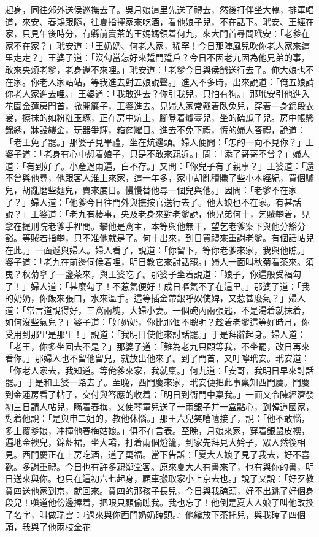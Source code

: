 \begin{showcontents}{}
起身，同往郊外送侯巡撫去了。吳月娘這里先送了禮去，然後打伴坐大轎，排軍唱道，來安、春鴻跟隨，往夏指揮家來吃酒，看他娘子兒，不在話下。玳安、王經在家，只見午後時分，有縣前賣茶的王媽媽領着何九，來大門首尋問玳安：「老爹在家不在家？」玳安道：「王奶奶、何老人家，稀罕！今日那陣風兒吹你老人家來這里走走？」王婆子道：「沒勾當怎好來踅門踅戶？今日不因老九因為他兄弟的事，敢來央煩老爹，老身還不來哩。」玳安道：「老爹今日與侯爺送行去了。俺大娘也不在家。你老人家站站，等我進去對五娘說聲。」進入不多時，出來說道：「俺五娘請你老人家進去哩。」王婆道：「我敢進去？你引我兒，只怕有狗。」那玳安引他進入花園金蓮房門首，掀開簾子，王婆進去。見婦人家常戴着臥兔兒，穿着一身錦段衣裳，擦抹的如粉粧玉琢，正在房中炕上，腳登着爐臺兒，坐的磕瓜子兒。房中帳懸錦綉，牀設縷金，玩器爭輝，箱奩耀目。進去不免下禮，慌的婦人答禮，說道：「老王免了罷。」那婆子見畢禮，坐在炕邊頭。婦人便問：「怎的一向不見你？」王婆子道：「老身有心中想着娘子，只是不敢來親近。」問：「添了哥哥不曾？」婦人道：「有到好了。小產過兩遍，白不存。」又問：「你兒子有了親事？」王婆道：「還不曾與他尋，他跟客人淮上來家，這一年多，家中胡亂積賺了些小本經紀，買個驢兒，胡亂磨些麵兒，賣來度日。慢慢替他尋一個兒與他。」因問：「老爹不在家了？」婦人道：「他爹今日往門外與撫按官送行去了。他大娘也不在家。有甚話說？」王婆道：「老九有樁事，央及老身來對老爹說，他兄弟何十，乞賊攀着，見拿在提刑院老爹手裡問。攀他是窩主，本等與他無干，望乞老爹案下與他分豁分豁。等賊若指攀，只不准他就是了。何十出來，到日買禮來重謝老爹。有個話帖兒在此。」一面遞與婦人。婦人看了，說道：「你留下，等你老爹來家，我與他瞧。」婆子道：「老九在前邊伺候着哩，明日教它來討話罷。」婦人一面叫秋菊看茶來。須曳？秋菊拿了一盞茶來，與王婆吃了。那婆子坐着說道：「娘子，你這般受福勾了！」婦人道：「甚麼勾了！不惹氣便好！成日嘔氣不了在這里。」那婆子道：「我的奶奶，你飯來張口，水來溫手。這等插金帶銀呼奴使婢，又惹甚麼氣？」婦人道：「常言道說得好，三窩兩塊，大婦小妻。一個碗內兩張匙，不是湯着就抹着，如何沒些氣兒？」婆子道：「好奶奶，你比那個不聰明？趁着老爹這等好時月，你受用到那里是那里！」說道：「我明日使他來討話罷。」于是拜辭起身。婦人道：「老王，你多坐回去不是？」那婆子道：「難為老九只顧等我，不坐罷，改日再來看你。」那婦人也不留他留兒，就放出他來了。到了門首，又叮嚀玳安。玳安道：「你老人家去，我知道。等俺爹來家，我就稟。」何九道：「安哥，我明日早來討話罷。」于是和王婆一路去了。至晚，西門慶來家，玳安便把此事稟知西門慶。門慶到金蓮房看了帖子，交付與答應的收着：「明日到衙門中稟我。」一面又令陳經濟發初三日請人帖兒，瞞着春梅，又使琴童兒送了一兩銀子并一盒點心，到韓道國家，對着他說：「是與申二姐的，教他休惱。」那王六兒笑嘻嘻接了，說：「他不敢惱，多上覆爹娘，冲撞他春梅姑娘。」俱不在言表。至晚，月娘來家，穿着銀鼠皮襖，遍地金襖兒，錦藍裙，坐大轎，打着兩個燈籠，到家先拜見大妗子，眾人然後相見。西門慶正在上房吃酒，道了萬福。當下告訴：「夏大人娘子見了我去，好不喜歡。多謝重禮。今日也有許多親鄰堂客。原來夏大人有書來了，也有與你的書，明日送來與你。也只在這初六七起身，顧車搬取家小上京去也。」說了又說：「好歹教賁四送他家到京，就回來。賁四的那孩子長兒，今日與我磕頭，好不出跳了好個身段兒！嗔道他傍邊捧着，把眼只顧偷瞧我。我也忘了！他倒是夏大人娘子叫他改換了名字，叫做瑞雲：『過來與你西門奶奶磕頭。』他纔放下茶托兒，與我磕了四個頭，我與了他兩枝金花
\end{showcontents}
